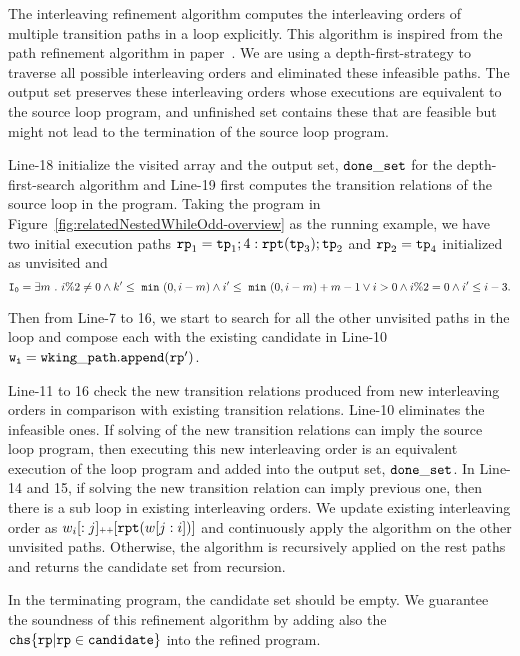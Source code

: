 The interleaving refinement algorithm computes the interleaving orders of multiple transition paths in a loop explicitly.
This algorithm is inspired from the path refinement algorithm in paper~\cite{GulwaniJK09}. 
We are using a depth-first-strategy to traverse all possible interleaving orders and eliminated these infeasible paths. The output set 
preserves these interleaving orders whose executions are equivalent to the source loop program, and unfinished
set contains these that are feasible but might not lead to the termination of the source loop program.

Line-18 initialize the visited array and the output set, $\mathtt{done\_set}$ for the depth-first-search algorithm and Line-19 first computes the transition relations of the source loop in the program.
Taking the program in Figure~\ref{fig:relatedNestedWhileOdd-overview} as the running example,
we have two initial execution paths $\mathtt{rp}_1 = \mathtt{tp}_1; 4:\mathtt{rpt}(\mathtt{tp}_3);\mathtt{tp}_2$ and $\mathtt{rp}_2 =\mathtt{tp}_4$ initialized as unvisited
and 
\[
   \mathtt{I_0} = \exists m ~.~ i \%2 \neq 0 \land k' \leq ~\mathtt{min}~(0, i - m) 
   \land i' \leq ~\mathtt{min}~(0, i - m) + m - 1 \lor  i > 0 \land i \%2 = 0 \land  i' \leq i - 3.
\]

Then from Line-7 to 16, we start to search for all the other unvisited paths  in the loop
and compose each with the existing candidate in Line-10 $\mathtt{w_i = wking\_path.append(\mathtt{rp}')}$.

Line-11 to 16 check the new transition relations produced from new
interleaving orders in comparison with existing transition relations.
Line-10 eliminates the infeasible ones.
If solving of the new transition relations can imply the source loop program,
then executing this new interleaving order is an equivalent execution of the loop program and added into the output set, $\mathtt{done\_set}$.
In Line-14 and 15, if solving the new transition relation can imply previous one, then there is a sub loop
in existing interleaving orders. We update existing interleaving order
as $w_i[:j] {\scriptscriptstyle ++} [\mathtt{rpt}(w[j:i])]$ and continuously apply the algorithm on the other unvisited paths.
Otherwise, the algorithm is recursively applied on the rest paths and returns the candidate set from recursion.

In the terminating program, the candidate set should be empty. We guarantee the soundness of this refinement algorithm
by adding also the $\rpchoose{ \rprog \vert \rprog \in \kw{candidate}}$ into the refined program.


